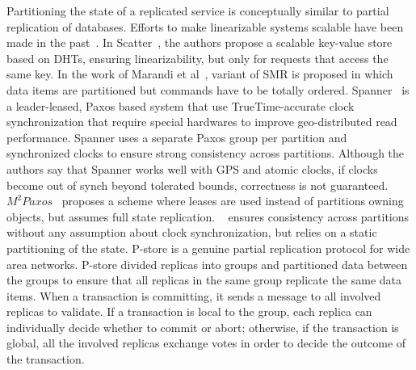 Partitioning the state of a replicated service is conceptually similar to
partial replication of databases. Efforts to make linearizable systems scalable
have been made in the past~\cite{bezerra2014ssmr, corbett2013spanner,
Glendenning:2011kj, Marandi:2011dj}.  In Scatter~\cite{Glendenning:2011kj}, the
authors propose a scalable key-value store based on DHTs, ensuring
linearizability, but only for requests that access the same key. In the work of
Marandi et al~\cite{Marandi:2011dj}, variant of SMR is proposed in which data
items are partitioned but commands have to be totally ordered.
Spanner~\cite{corbett2013spanner} is a leader-leased, Paxos based system that
use TrueTime-accurate clock synchronization that require special hardwares to
improve geo-distributed read performance. Spanner uses a separate Paxos group
per partition and synchronized clocks to ensure strong consistency across
partitions. Although the authors say that Spanner works well with GPS and atomic
clocks, if clocks become out of synch beyond tolerated bounds, correctness is
not guaranteed. $M^2Paxos$~\cite{7579738} proposes a scheme where leases are
used instead of partitions owning objects, but assumes full state replication.
\ssmr{}~\cite{bezerra2014ssmr} ensures consistency across partitions without any
assumption about clock synchronization, but relies on a static partitioning of
the state. P-store \cite{Schiper:2010pstore} is a genuine partial replication
protocol for wide area networks. P-store divided replicas into groups and
partitioned data between the groups to ensure that all replicas in the same
group replicate the same data items. When a transaction is committing, it sends
a message to all involved replicas to validate. If a transaction is local to the
group, each replica can individually decide whether to commit or abort;
otherwise, if the transaction is global, all the involved replicas exchange
votes in order to decide the outcome of the transaction.



